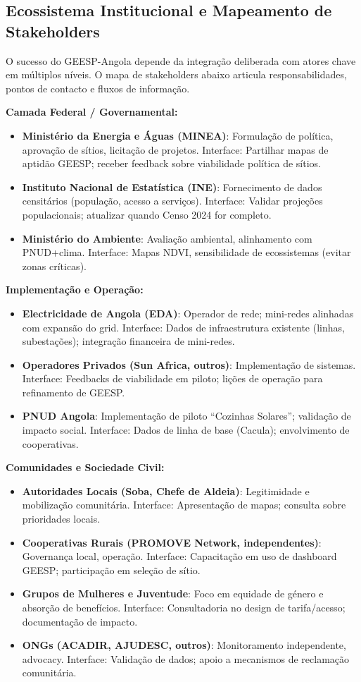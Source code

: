 \documentclass[12pt, a4paper]{article}
\begin{document}
\subsection{Ecossistema Institucional e Mapeamento de Stakeholders}

O sucesso do GEESP-Angola depende da integração deliberada com atores chave em múltiplos níveis. O mapa de stakeholders abaixo articula responsabilidades, pontos de contacto e fluxos de informação.

\textbf{Camada Federal / Governamental:}
\begin{itemize}
\item \textbf{Ministério da Energia e Águas (MINEA)}: Formulação de política, aprovação de sítios, licitação de projetos. Interface: Partilhar mapas de aptidão GEESP; receber feedback sobre viabilidade política de sítios.
\item \textbf{Instituto Nacional de Estatística (INE)}: Fornecimento de dados censitários (população, acesso a serviços). Interface: Validar projeções populacionais; atualizar quando Censo 2024 for completo.
\item \textbf{Ministério do Ambiente}: Avaliação ambiental, alinhamento com PNUD+clima. Interface: Mapas NDVI, sensibilidade de ecossistemas (evitar zonas críticas).
\end{itemize}

\textbf{Implementação e Operação:}
\begin{itemize}
\item \textbf{Electricidade de Angola (EDA)}: Operador de rede; mini-redes alinhadas com expansão do grid. Interface: Dados de infraestrutura existente (linhas, subestações); integração financeira de mini-redes.
\item \textbf{Operadores Privados (Sun Africa, outros)}: Implementação de sistemas. Interface: Feedbacks de viabilidade em piloto; lições de operação para refinamento de GEESP.
\item \textbf{PNUD Angola}: Implementação de piloto ``Cozinhas Solares''; validação de impacto social. Interface: Dados de linha de base (Cacula); envolvimento de cooperativas.
\end{itemize}

\textbf{Comunidades e Sociedade Civil:}
\begin{itemize}
\item \textbf{Autoridades Locais (Soba, Chefe de Aldeia)}: Legitimidade e mobilização comunitária. Interface: Apresentação de mapas; consulta sobre prioridades locais.
\item \textbf{Cooperativas Rurais (PROMOVE Network, independentes)}: Governança local, operação. Interface: Capacitação em uso de dashboard GEESP; participação em seleção de sítio.
\item \textbf{Grupos de Mulheres e Juventude}: Foco em equidade de género e absorção de benefícios. Interface: Consultadoria no design de tarifa/acesso; documentação de impacto.
\item \textbf{ONGs (ACADIR, AJUDESC, outros)}: Monitoramento independente, advocacy. Interface: Validação de dados; apoio a mecanismos de reclamação comunitária.
\end{itemize}
\end{document}
